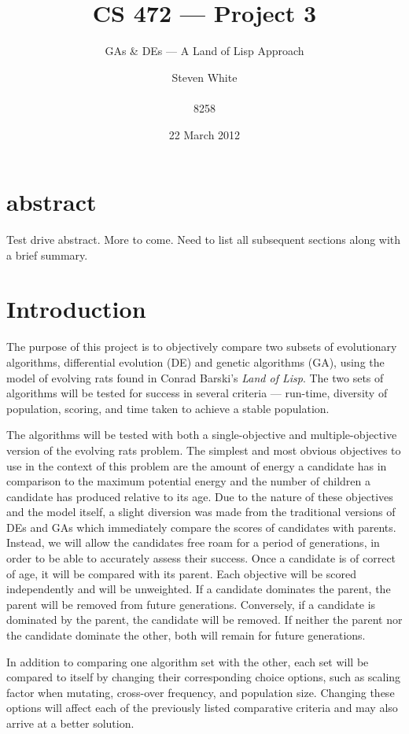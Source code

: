 \documentclass{sig-alternate}
\title{CS 472 --- Project 3}
\subtitle {GAs \& DEs --- A Land of Lisp Approach}
\author{
\alignauthor
Steven White \\
  \email{swhite24@mix.wvu.edu}\\
  8258
}
\begin{document}
\date{22 March 2012}

\maketitle
\section{abstract}
Test drive abstract. More to come.  Need to list all subsequent
sections along with a brief summary.

\section{Introduction}
The purpose of this project is to objectively compare two subsets of evolutionary algorithms, differential evolution (DE) and genetic algorithms (GA), using the model of evolving rats found in Conrad Barski's \emph{Land of Lisp}.  The two sets of algorithms will be tested for success in several criteria --- run-time, diversity of population, scoring, and time taken to achieve a stable population.

The algorithms will be tested with both a single-objective and multiple-objective version of the evolving rats problem.  The simplest and most obvious objectives to use in the context of this problem are the amount of energy a candidate has in comparison to the maximum potential energy and the number of children a candidate has produced relative to its age.  Due to the nature of these objectives and the model itself, a slight diversion was made from the traditional versions of DEs and GAs which immediately compare the scores of candidates with parents.  Instead, we will allow the candidates free roam for a period of generations, in order to be able to accurately assess their success.  Once a candidate is of correct of age, it will be compared with its parent.  Each objective will be scored independently and will be unweighted.  If a candidate dominates the parent, the parent will be removed from future generations.  Conversely, if a candidate is dominated by the parent, the candidate will be removed.  If neither the parent nor the candidate dominate the other, both will remain for future generations.

In addition to comparing one algorithm set with the other, each set will be compared to itself by changing their corresponding choice options, such as scaling factor when mutating, cross-over frequency, and population size.  Changing these options will affect each of the previously listed comparative criteria and may also arrive at a better solution.
\end{document}
